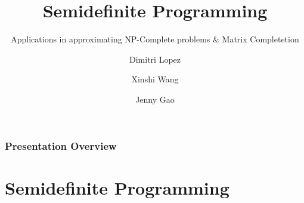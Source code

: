 \documentclass[
	11pt, %
]{beamer}
\title[Semidefinite Programming]{Semidefinite Programming} %
\subtitle{Applications in approximating NP-Complete problems \& Matrix Completetion} %
\author[]{Dimitri Lopez \and Xinshi Wang \and Jenny Gao} %
\institute[RPI]{Rensselaer Polytechnic Institute} %
\begin{document}

\begin{frame}
	\titlepage %
\end{frame}



\begin{frame}
	\frametitle{Presentation Overview} %

	\tableofcontents %
\end{frame}


\section{Semidefinite Programming}

\end{document}
